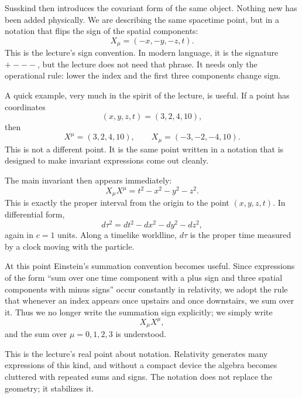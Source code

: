 Susskind then introduces the covariant form of the same object. Nothing new has been added physically. We are describing the same spacetime point, but in a notation that flips the sign of the spatial components:
\begin{equation}
X_\mu = (-x,-y,-z,t).
\end{equation}
This is the lecture's sign convention. In modern language, it is the signature \(+---\), but the lecture does not need that phrase. It needs only the operational rule: lower the index and the first three components change sign.

A quick example, very much in the spirit of the lecture, is useful. If a point has coordinates
\begin{equation}
(x,y,z,t)=(3,2,4,10),
\end{equation}
then
\begin{equation}
X^\mu=(3,2,4,10),
\qquad
X_\mu=(-3,-2,-4,10).
\end{equation}
This is not a different point. It is the same point written in a notation that is designed to make invariant expressions come out cleanly.

The main invariant then appears immediately:
\begin{equation}
X_\mu X^\mu = t^2 - x^2 - y^2 - z^2.
\end{equation}
This is exactly the proper interval from the origin to the point \((x,y,z,t)\). In differential form,
\begin{equation}
d\tau^2 = dt^2 - dx^2 - dy^2 - dz^2,
\end{equation}
again in \(c=1\) units. Along a timelike worldline, \(d\tau\) is the proper time measured by a clock moving with the particle.

At this point Einstein's summation convention becomes useful. Since expressions of the form ``sum over one time component with a plus sign and three spatial components with minus signs'' occur constantly in relativity, we adopt the rule that whenever an index appears once upstairs and once downstairs, we sum over it. Thus we no longer write the summation sign explicitly; we simply write
\begin{equation}
X_\mu X^\mu,
\end{equation}
and the sum over \(\mu=0,1,2,3\) is understood.

This is the lecture's real point about notation. Relativity generates many expressions of this kind, and without a compact device the algebra becomes cluttered with repeated sums and signs. The notation does not replace the geometry; it stabilizes it.

